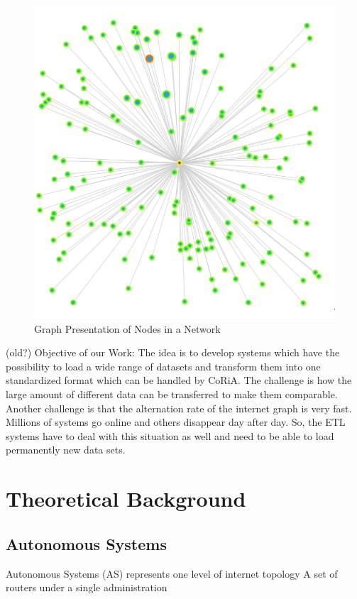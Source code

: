 \documentclass[conference]{IEEEtran}
\begin{document}
\begin{figure}[htbp]
\centerline{\includegraphics[scale=0.2]{Graphics/nodePresentaion.PNG}}
\caption{Graph Presentation of Nodes in a Network}
\label{fig}
\end{figure}


(old?)
Objective of our Work:
The idea is to develop systems which have the possibility to load a wide range of datasets and transform them into one standardized format which can be handled by CoRiA.
The challenge is how the large amount of different data can be transferred to make them comparable.
Another challenge is that the alternation rate of the internet graph is very fast. Millions of systems go online and others disappear day after day. So, the ETL systems have to deal with this situation as well and need to be able to load permanently new data sets.

\section{Theoretical Background}
\subsection{Autonomous Systems}

Autonomous Systems (AS) represents one level of internet topology
A set of routers under a single administration
\end{document}
